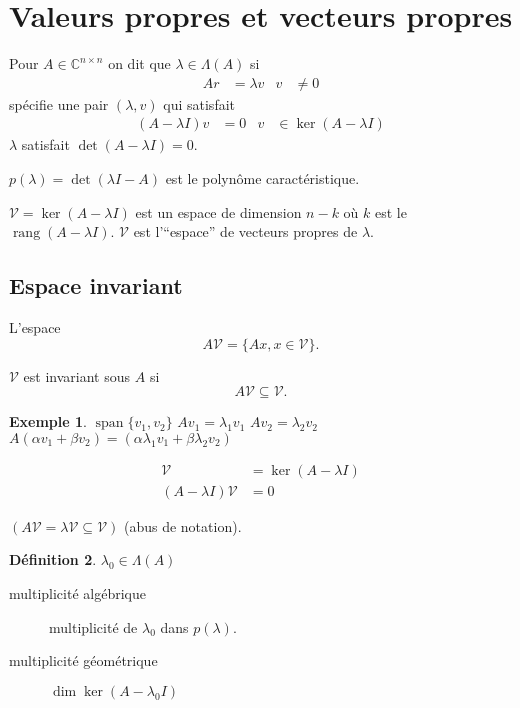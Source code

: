 \documentclass[11pt,a4paper]{article}
\newcommand{\C}{\mathbb{C}}
\newcommand{\Cnn}{\C^{n\times n}}
\newcommand{\V}{\mathcal{V}}
\theoremstyle{definition}
\newtheorem{mydef}{Définition}
\newtheorem{myexem}[mydef]{Exemple}
\DeclareMathOperator{\rang}{rang}
\DeclareMathOperator{\myspan}{span}
\begin{document}
\section{Valeurs propres et vecteurs propres}
Pour $A \in \Cnn$ on dit que $\lambda \in \Lambda(A)$ si
\begin{align*}
  Ar & = \lambda v & v & \neq 0
\end{align*}
spécifie une pair $(\lambda,v)$ qui satisfait
\begin{align*}
  (A - \lambda I)v & = 0 & v & \in \ker(A - \lambda I)
\end{align*}
$\lambda$ satisfait $\det(A - \lambda I) = 0$.

$p(\lambda) = \det(\lambda I - A)$ est le polynôme caractéristique.

$\V = \ker(A - \lambda I)$ est un espace de dimension $n - k$ où $k$ est le $\rang(A - \lambda I)$.
$\V$ est l'``espace'' de vecteurs propres de $\lambda$.

\subsection{Espace invariant}
L'espace
$$A\V = \{Ax, x \in \V\}.$$

$\V$ est invariant sous $A$ si
$$A \V \subseteq \V.$$

\begin{myexem}
  $\myspan\{v_1,v_2\}$
  $Av_1 = \lambda_1v_1$
  $Av_2 = \lambda_2v_2$
  $A (\alpha v_1 + \beta v_2) = (\alpha\lambda_1 v_1 + \beta \lambda_2 v_2)$
\end{myexem}

\begin{align*}
  \V & = \ker(A - \lambda I)\\
  (A - \lambda I) \V & = 0
\end{align*}

$(A\V = \lambda \V \subseteq \V)$ (abus de notation).

\begin{mydef}
  $\lambda_0 \in \Lambda(A)$
  \begin{description}
    \item[multiplicité algébrique] multiplicité de $\lambda_0$ dans $p(\lambda)$.
    \item[multiplicité géométrique] $\dim\ker(A-\lambda_0 I)$
  \end{description}
\end{mydef}
\end{document}
